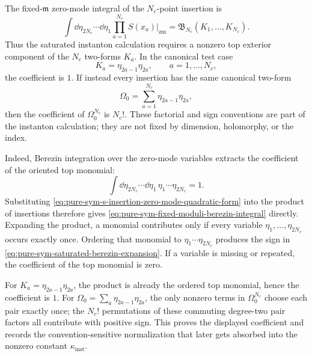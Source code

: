 The fixed-\(\mathfrak m\) zero-mode integral of the \(N_c\)-point insertion is
\begin{equation}
  \int \dd\eta_{2N_c}\cdots\dd\eta_1
  \prod_{a=1}^{N_c}S(x_a)\big|_{\mathrm{zm}}
  =
  \mathfrak B_{N_c}(K_1,\ldots,K_{N_c}) .
  \label{eq:pure-sym-fixed-moduli-berezin-integral}
\end{equation}
Thus the saturated instanton calculation requires a nonzero top exterior
component of the \(N_c\) two-forms \(K_a\).  In the canonical test case
\[
  K_a=\eta_{2a-1}\eta_{2a},
  \qquad a=1,\ldots,N_c,
\]
the coefficient is \(1\).  If instead every insertion has the same canonical
two-form
\[
  \Omega_0=\sum_{a=1}^{N_c}\eta_{2a-1}\eta_{2a},
\]
then the coefficient of \(\Omega_0^{N_c}\) is \(N_c!\).  These factorial and
sign conventions are part of the instanton calculation; they are not fixed
by dimension, holomorphy, or the index.

Indeed, Berezin integration over the zero-mode variables extracts the coefficient of
the oriented top monomial:
\[
  \int \dd\eta_{2N_c}\cdots\dd\eta_1\,
  \eta_1\cdots\eta_{2N_c}=1 .
\]
Substituting
\eqref{eq:pure-sym-s-insertion-zero-mode-quadratic-form} into the product of
insertions therefore gives
\eqref{eq:pure-sym-fixed-moduli-berezin-integral} directly.  Expanding the
product, a monomial contributes only if every variable
\(\eta_1,\ldots,\eta_{2N_c}\) occurs exactly once.  Ordering that monomial to
\(\eta_1\cdots\eta_{2N_c}\) produces the sign in
\eqref{eq:pure-sym-saturated-berezin-expansion}.  If a variable is missing or
repeated, the coefficient of the top monomial is zero.

For \(K_a=\eta_{2a-1}\eta_{2a}\), the product is already the ordered top
monomial, hence the coefficient is \(1\).  For
\(\Omega_0=\sum_a\eta_{2a-1}\eta_{2a}\), the only nonzero terms in
\(\Omega_0^{N_c}\) choose each pair exactly once; the \(N_c!\) permutations
of these commuting degree-two pair factors all contribute with positive sign.
This proves the displayed coefficient and records the convention-sensitive
normalization that later gets absorbed into the nonzero constant
\(\kappa_{\mathrm{inst}}\).

